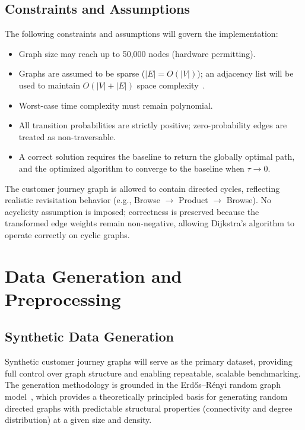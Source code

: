 \subsection{Constraints and Assumptions}

The following constraints and assumptions will govern the implementation:
\begin{itemize}
    \item Graph size may reach up to 50,000 nodes (hardware permitting).
    \item Graphs are assumed to be sparse ($|E| = O(|V|)$); an adjacency list will be used to maintain $O(|V|+|E|)$ space complexity~\citep{cormen2009}.
    \item Worst-case time complexity must remain polynomial.
    \item All transition probabilities are strictly positive; zero-probability edges are treated as non-traversable.
    \item A correct solution requires the baseline to return the globally optimal path, and the optimized algorithm to converge to the baseline when $\tau \to 0$.
\end{itemize}

\item The customer journey graph is allowed to contain directed cycles, reflecting realistic revisitation behavior (e.g., Browse $\rightarrow$ Product $\rightarrow$ Browse). No acyclicity assumption is imposed; correctness is preserved because the transformed edge weights remain non-negative, allowing Dijkstra's algorithm to operate correctly on cyclic graphs.

\section{Data Generation and Preprocessing}

\subsection{Synthetic Data Generation}

Synthetic customer journey graphs will serve as the primary dataset, providing full control over graph structure and enabling repeatable, scalable benchmarking. The generation methodology is grounded in the Erd\H{o}s--R\'{e}nyi random graph model~\citep{erdosrenyi1960}, which provides a theoretically principled basis for generating random directed graphs with predictable structural properties (connectivity and degree distribution) at a given size and density.

